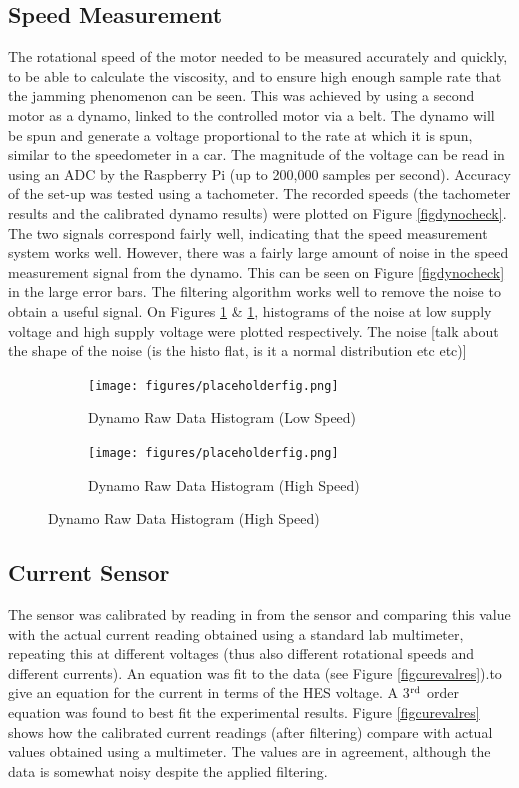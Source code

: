 \documentclass[twoside,a4]{report}
\def\br{\newline \newline \noindent}
\begin{document}
	\subsection*{Speed Measurement} %
	The rotational speed of the motor needed to be measured accurately and quickly, to be able to calculate the viscosity, and to ensure high enough sample rate that the jamming phenomenon can be seen. This was achieved by using a second motor as a dynamo, linked to the controlled motor via a belt. The dynamo will be spun and generate a voltage proportional to the rate at which it is spun, similar to the speedometer in a car. The magnitude of the voltage can be read in using an ADC by the Raspberry Pi (up to 200,000 samples per second). Accuracy of the set-up was tested using a tachometer. The recorded speeds (the tachometer results and the calibrated dynamo results) were plotted on Figure \ref{figdynocheck}. The two signals correspond fairly well, indicating that the speed measurement system works well. However, there was a fairly large amount of noise in the speed measurement signal from the dynamo. This can be seen on Figure \ref{figdynocheck} in the large error bars. The filtering algorithm works well to remove the noise to obtain a useful signal. On Figures \ref{fignoisehistolow} \& \ref{fignoisehistolow}, histograms of the noise at low supply voltage and high supply voltage were plotted respectively. The noise [talk about the shape of the noise (is the histo flat, is it a normal distribution etc etc)]\br
	\begin{figure}[!htb]
		\centering
		\begin{subfigure}{0.45\textwidth}
			\centering
			\texttt{[image: figures/placeholderfig.png]}
			\caption{Dynamo Raw Data Histogram (Low Speed)}
			\label{fignoisehistolow}
		\end{subfigure}
		\begin{subfigure}{0.45\textwidth}
			\centering
			\texttt{[image: figures/placeholderfig.png]}
			\caption{Dynamo Raw Data Histogram (High Speed)}
			\label{fignoisehistohigh}
		\end{subfigure}
	\end{figure}
	
	\subsection*{Current Sensor}
	The sensor was calibrated by reading in from the sensor and comparing this value with the actual current reading obtained using a standard lab multimeter, repeating this at different voltages (thus also different rotational speeds and different currents). An equation was fit to the data (see Figure \ref{figcurevalres}).to give an equation for the current in terms of the HES voltage. A 3$\rm ^{rd}$ order equation was found to best fit the experimental results.\br
	Figure \ref{figcurevalres} shows how the calibrated current readings (after filtering) compare with actual values obtained using a multimeter. The values are in agreement, although the data is somewhat noisy despite the applied filtering.
	
\end{document}
